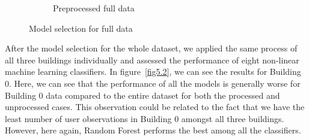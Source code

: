 \documentclass[a4paper,singleside,12pt]{report} %
\begin{document}
\begin{figure}[!htb]
\begin{subfigure}[b]{0.48\linewidth}
			    \caption{Preprocessed full data}
			  \end{subfigure}
			  \caption{Model selection for full data}
			  \label{fig5.1}
			\end{figure} 
			
			After the model selection for the whole dataset, we applied the same process of all three buildings individually and assessed the performance of eight non-linear machine learning classifiers. 
			In figure~\ref{fig5.2}, we can see the results for Building 0. 
			Here, we can see that the performance of all the models is generally worse for Building 0 data compared to the entire dataset for both the processed and unprocessed cases. 
			This observation could be related to the fact that we have the least number of user observations in Building 0 amongst all three buildings. 
			However, here again, Random Forest performs the best among all the classifiers. 
			
\end{document}
